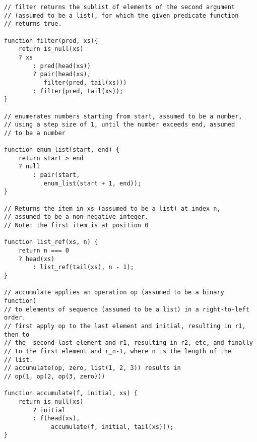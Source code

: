 \begin{lstlisting}
// filter returns the sublist of elements of the second argument
// (assumed to be a list), for which the given predicate function
// returns true.

function filter(pred, xs){
    return is_null(xs)
	? xs
        : pred(head(xs))
	    ? pair(head(xs),
		   filter(pred, tail(xs)))
	    : filter(pred, tail(xs));
}

// enumerates numbers starting from start, assumed to be a number,
// using a step size of 1, until the number exceeds end, assumed
// to be a number

function enum_list(start, end) {
    return start > end
	? null
        : pair(start,
	       enum_list(start + 1, end));
}

// Returns the item in xs (assumed to be a list) at index n,
// assumed to be a non-negative integer.
// Note: the first item is at position 0

function list_ref(xs, n) {
    return n === 0
	? head(xs)
        : list_ref(tail(xs), n - 1);
}

// accumulate applies an operation op (assumed to be a binary function)
// to elements of sequence (assumed to be a list) in a right-to-left order.
// first apply op to the last element and initial, resulting in r1, then to
// the  second-last element and r1, resulting in r2, etc, and finally
// to the first element and r_n-1, where n is the length of the
// list.
// accumulate(op, zero, list(1, 2, 3)) results in
// op(1, op(2, op(3, zero)))

function accumulate(f, initial, xs) {
    return is_null(xs)
        ? initial
        : f(head(xs),
             accumulate(f, initial, tail(xs)));
}
\end{lstlisting}


